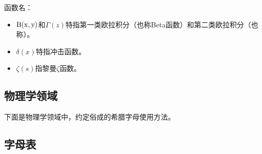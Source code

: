 函数名：

\begin{itemize}
\item ${\rm B(x,y)}$和${\Gamma (z)}$特指第一类欧拉积分（也称Beta函数）和第二类欧拉积分（也称）。
\item $\delta(x)$特指冲击函数。
\item $\zeta(s)$指黎曼$\zeta$函数。
\end{itemize}

\subsection{物理学领域}

下面是物理学领域中，约定俗成的希腊字母使用方法。

\subsection{字母表}


